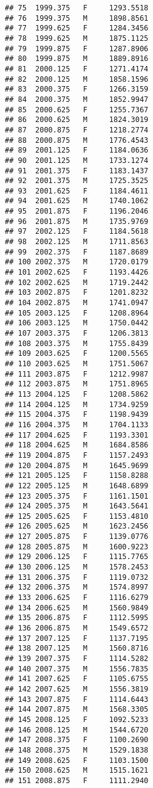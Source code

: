 \documentclass[]{article}
\begin{document}
\begin{verbatim}
## 75  1999.375   F     1293.5518
## 76  1999.375   M     1898.8561
## 77  1999.625   F     1284.3456
## 78  1999.625   M     1875.1125
## 79  1999.875   F     1287.8906
## 80  1999.875   M     1889.8916
## 81  2000.125   F     1271.4174
## 82  2000.125   M     1858.1596
## 83  2000.375   F     1266.3159
## 84  2000.375   M     1852.9947
## 85  2000.625   F     1255.7367
## 86  2000.625   M     1824.3019
## 87  2000.875   F     1218.2774
## 88  2000.875   M     1776.4543
## 89  2001.125   F     1184.0636
## 90  2001.125   M     1733.1274
## 91  2001.375   F     1183.1437
## 92  2001.375   M     1725.3525
## 93  2001.625   F     1184.4611
## 94  2001.625   M     1740.1062
## 95  2001.875   F     1196.2046
## 96  2001.875   M     1735.9769
## 97  2002.125   F     1184.5618
## 98  2002.125   M     1711.8563
## 99  2002.375   F     1187.8689
## 100 2002.375   M     1720.0179
## 101 2002.625   F     1193.4426
## 102 2002.625   M     1719.2442
## 103 2002.875   F     1201.8232
## 104 2002.875   M     1741.0947
## 105 2003.125   F     1208.8964
## 106 2003.125   M     1750.0442
## 107 2003.375   F     1206.3813
## 108 2003.375   M     1755.8439
## 109 2003.625   F     1200.5565
## 110 2003.625   M     1751.5067
## 111 2003.875   F     1212.9987
## 112 2003.875   M     1751.8965
## 113 2004.125   F     1208.5862
## 114 2004.125   M     1734.9259
## 115 2004.375   F     1198.9439
## 116 2004.375   M     1704.1133
## 117 2004.625   F     1193.3301
## 118 2004.625   M     1684.8586
## 119 2004.875   F     1157.2493
## 120 2004.875   M     1645.9699
## 121 2005.125   F     1158.8288
## 122 2005.125   M     1648.6899
## 123 2005.375   F     1161.1501
## 124 2005.375   M     1643.5641
## 125 2005.625   F     1153.4810
## 126 2005.625   M     1623.2456
## 127 2005.875   F     1139.0776
## 128 2005.875   M     1600.9223
## 129 2006.125   F     1115.7765
## 130 2006.125   M     1578.2453
## 131 2006.375   F     1119.0732
## 132 2006.375   M     1574.8997
## 133 2006.625   F     1116.6279
## 134 2006.625   M     1560.9849
## 135 2006.875   F     1112.5995
## 136 2006.875   M     1549.6572
## 137 2007.125   F     1137.7195
## 138 2007.125   M     1560.8716
## 139 2007.375   F     1114.5282
## 140 2007.375   M     1556.7835
## 141 2007.625   F     1105.6755
## 142 2007.625   M     1556.3819
## 143 2007.875   F     1114.6443
## 144 2007.875   M     1568.3305
## 145 2008.125   F     1092.5233
## 146 2008.125   M     1544.6720
## 147 2008.375   F     1100.2690
## 148 2008.375   M     1529.1838
## 149 2008.625   F     1103.1500
## 150 2008.625   M     1515.1621
## 151 2008.875   F     1111.2940

\end{verbatim}
\end{document}

